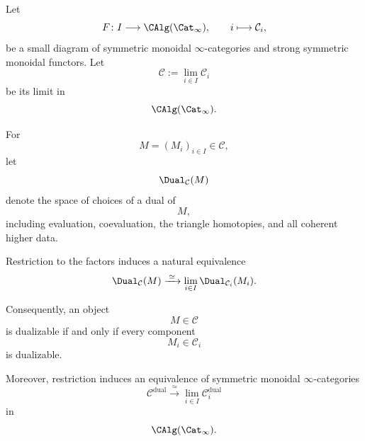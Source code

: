 \begin{lemma}
\label{lem:duality-data-commute-with-limits}
Let
\[
    F
    \colon
    I
    \longrightarrow
    \CAlg(\Cat_\infty),
    \qquad
    i
    \longmapsto
    \mathcal C_i,
\]
be a small diagram of symmetric monoidal $\infty$-categories and strong
symmetric monoidal functors. Let
\[
    \mathcal C
    :=
    \lim_{i\in I}\mathcal C_i
\]
be its limit in
\[
    \CAlg(\Cat_\infty).
\]

For
\[
    M=(M_i)_{i\in I}\in\mathcal C,
\]
let
\[
    \Dual_{\mathcal C}(M)
\]
denote the space of choices of a dual of
\[
    M,
\]
including evaluation, coevaluation, the triangle homotopies, and all
coherent higher data.

Restriction to the factors induces a natural equivalence
\[
    \Dual_{\mathcal C}(M)
    \xrightarrow{\;\simeq\;}
    \lim_{i\in I}
    \Dual_{\mathcal C_i}(M_i).
\]

Consequently, an object
\[
    M\in\mathcal C
\]
is dualizable if and only if every component
\[
    M_i\in\mathcal C_i
\]
is dualizable.

Moreover, restriction induces an equivalence of symmetric monoidal
$\infty$-categories
\[
    \mathcal C^{\mathrm{dual}}
    \xrightarrow{\;\simeq\;}
    \lim_{i\in I}
    \mathcal C_i^{\mathrm{dual}}
\]
in
\[
    \CAlg(\Cat_\infty).
\]
\end{lemma}

